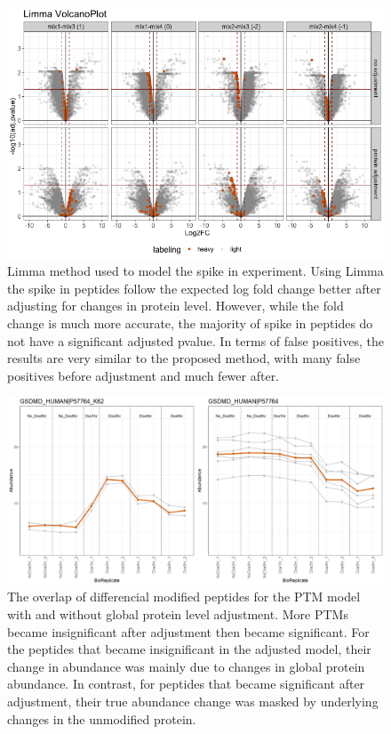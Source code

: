 \documentclass[mcp]{article}
\numberwithin{figure}{section} %
\numberwithin{table}{section}
\begin{document}
\begin{figure}[ht]
\centering
\includegraphics[width=1\textwidth]{images/spike_in_limma_volcano.png}
\caption{Limma method used to model the spike in experiment. Using Limma the spike in peptides follow the expected log fold change better after adjusting for changes in protein level. However, while the fold change is much more accurate, the majority of spike in peptides do not have a significant adjusted pvalue. In terms of false positives, the results are very similar to the proposed method, with many false positives before adjustment and much fewer after.
}\label{fig:spikein_limma_volcano}
\end{figure}

\begin{figure}[ht]
\centering
\includegraphics[width=1\textwidth]{images/IpaH_prof_plot.png}
\caption{The overlap of differencial modified peptides for the PTM model with and without global protein level adjustment. More PTMs became insignificant after adjustment then became significant. For the peptides that became insignificant in the adjusted model, their change in abundance was mainly due to changes in global protein abundance. In contrast, for peptides that became significant after adjustment, their true abundance change was masked by underlying changes in the unmodified protein.}
\label{fig:ipah_venn_diagramm}
\end{figure}
\end{document}

